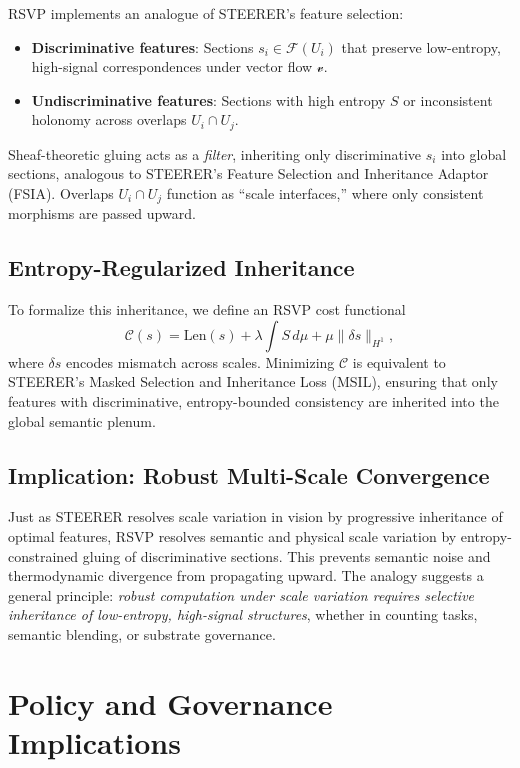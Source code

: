 \documentclass[12pt]{article}
\begin{document}
RSVP implements an analogue of STEERER’s feature selection:
\begin{itemize}
    \item \textbf{Discriminative features}: Sections $s_i \in \mathcal{F}(U_i)$ that preserve low-entropy, high-signal correspondences under vector flow $\mathcal{v}$.
    \item \textbf{Undiscriminative features}: Sections with high entropy $S$ or inconsistent holonomy across overlaps $U_i \cap U_j$.
\end{itemize}
Sheaf-theoretic gluing acts as a \emph{filter}, inheriting only discriminative $s_i$ into global sections, analogous to STEERER’s Feature Selection and Inheritance Adaptor (FSIA). Overlaps $U_i \cap U_j$ function as ``scale interfaces,'' where only consistent morphisms are passed upward.

\subsection{Entropy-Regularized Inheritance}

To formalize this inheritance, we define an RSVP cost functional
\[
\mathcal{C}(s) = \mathrm{Len}(s) + \lambda \int S\, d\mu + \mu \|\delta s\|_{H^1},
\]
where $\delta s$ encodes mismatch across scales. Minimizing $\mathcal{C}$ is equivalent to STEERER’s Masked Selection and Inheritance Loss (MSIL), ensuring that only features with discriminative, entropy-bounded consistency are inherited into the global semantic plenum.

\subsection{Implication: Robust Multi-Scale Convergence}

Just as STEERER resolves scale variation in vision by progressive inheritance of optimal features, RSVP resolves semantic and physical scale variation by entropy-constrained gluing of discriminative sections. This prevents semantic noise and thermodynamic divergence from propagating upward. The analogy suggests a general principle: \emph{robust computation under scale variation requires selective inheritance of low-entropy, high-signal structures}, whether in counting tasks, semantic blending, or substrate governance.


\section{Policy and Governance Implications}
\end{document}
